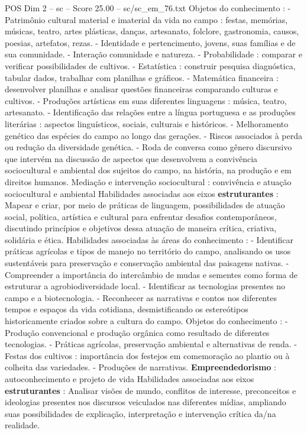 \begin{textsample}{POS Dim 2 – sc – Score 25.00 – sc/sc\_em\_76.txt}
Objetos do conhecimento : - Patrimônio cultural material e imaterial da vida no campo : festas, memórias, músicas, teatro, artes plásticas, danças, artesanato, folclore, gastronomia, causos, poesias, artefatos, rezas. - Identidade e pertencimento, jovens, suas famílias e de sua comunidade. - Interação comunidade e natureza. - Probabilidade : comparar e verificar possibilidades de cultivos. - Estatística : construir pesquisa diagnóstica, tabular dados, trabalhar com planilhas e gráficos. - Matemática financeira : desenvolver planilhas e analisar questões financeiras comparando culturas e cultivos. - Produções artísticas em suas diferentes linguagens : música, teatro, artesanato. - Identificação das relações entre a língua portuguesa e as produções literárias : aspectos linguísticos, sociais, culturais e históricos. - Melhoramento genético das espécies do campo ao longo das gerações. - Riscos associados à perda ou redução da diversidade genética. - Roda de conversa como gênero discursivo que intervém na discussão de aspectos que desenvolvem a convivência sociocultural e ambiental dos sujeitos do campo, na história, na produção e em direitos humanos.
Mediação e intervenção sociocultural : convivência e atuação sociocultural e ambiental Habilidades associadas aos eixos \textbf{estruturantes} : Mapear e criar, por meio de práticas de linguagem, possibilidades de atuação social, política, artística e cultural para enfrentar desafios contemporâneos, discutindo princípios e objetivos dessa atuação de maneira crítica, criativa, solidária e ética.
Habilidades associadas às áreas do conhecimento : - Identificar práticas agrícolas e tipos de manejo no território do campo, analisando os usos sustentáveis para preservação e conservação ambiental das paisagens nativas. - Compreender a importância do intercâmbio de mudas e sementes como forma de estruturar a agrobiodiversidade local. - Identificar as tecnologias presentes no campo e a biotecnologia. - Reconhecer as narrativas e contos nos diferentes tempos e espaços da vida cotidiana, desmistificando os estereótipos historicamente criados sobre a cultura do campo.
Objetos do conhecimento : - Produção convencional e produção orgânica como resultado de diferentes tecnologias. - Práticas agrícolas, preservação ambiental e alternativas de renda. - Festas dos cultivos : importância dos festejos em comemoração ao plantio ou à colheita das variedades. - Produções de narrativas. \textbf{Empreendedorismo} : autoconhecimento e projeto de vida Habilidades associadas aos eixos \textbf{estruturantes} : Analisar visões de mundo, conflitos de interesse, preconceitos e ideologias presentes nos discursos veiculados nas diferentes mídias, ampliando suas possibilidades de explicação, interpretação e intervenção crítica da/na realidade.

\end{textsample}

